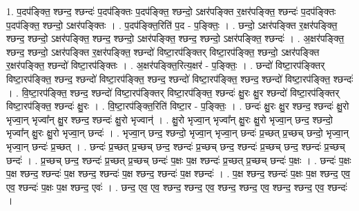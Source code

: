 \documentclass[17pt]{extarticle}
\begin{document}
1. प॒दप॑ङ्क्ति॒ श्छन्द॒ श्छन्दः॑ प॒दप॑ङ्क्तिः प॒दप॑ङ्क्ति॒ श्छन्दो॒ ऽक्षर॑पङ्क्ति र॒क्षर॑पङ्क्ति॒ श्छन्दः॑ प॒दप॑ङ्क्तिः प॒दप॑ङ्क्ति॒ श्छन्दो॒ ऽक्षर॑पङ्क्तिः । . प॒दप॑ङ्क्ति॒रिति॑ प॒द - प॒ङ्क्तिः॒ । . छन्दो॒ ऽक्षर॑पङ्क्ति र॒क्षर॑पङ्क्ति॒ श्छन्द॒ श्छन्दो॒ ऽक्षर॑पङ्क्ति॒ श्छन्द॒ श्छन्दो॒ ऽक्षर॑पङ्क्ति॒ श्छन्द॒ श्छन्दो॒ ऽक्षर॑पङ्क्ति॒ श्छन्दः॑ । . अ॒क्षर॑पङ्क्ति॒ श्छन्द॒ श्छन्दो॒ ऽक्षर॑पङ्क्ति र॒क्षर॑पङ्क्ति॒ श्छन्दो॑ विष्टा॒रप॑ङ्क्तिर् विष्टा॒रप॑ङ्क्ति॒ श्छन्दो॒ ऽक्षर॑पङ्क्ति र॒क्षर॑पङ्क्ति॒ श्छन्दो॑ विष्टा॒रप॑ङ्क्तिः । . अ॒क्षर॑पङ्क्ति॒रित्य॒क्षर॑ - प॒ङ्क्तिः॒ । . छन्दो॑ विष्टा॒रप॑ङ्क्तिर् विष्टा॒रप॑ङ्क्ति॒ श्छन्द॒ श्छन्दो॑ विष्टा॒रप॑ङ्क्ति॒ श्छन्द॒ श्छन्दो॑ विष्टा॒रप॑ङ्क्ति॒ श्छन्द॒ श्छन्दो॑ विष्टा॒रप॑ङ्क्ति॒ श्छन्दः॑ । . वि॒ष्टा॒रप॑ङ्क्ति॒ श्छन्द॒ श्छन्दो॑ विष्टा॒रप॑ङ्क्तिर् विष्टा॒रप॑ङ्क्ति॒ श्छन्दः॑ क्षु॒रः क्षु॒र श्छन्दो॑ विष्टा॒रप॑ङ्क्तिर् विष्टा॒रप॑ङ्क्ति॒ श्छन्दः॑ क्षु॒रः । . वि॒ष्टा॒रप॑ङ्क्ति॒रिति॑ विष्टा॒र - प॒ङ्क्तिः॒ । . छन्दः॑ क्षु॒रः क्षु॒र श्छन्द॒ श्छन्दः॑ क्षु॒रो भृज्वा॒न् भृज्वा᳚न् क्षु॒र श्छन्द॒ श्छन्दः॑ क्षु॒रो भृज्वान्॑ । . क्षु॒रो भृज्वा॒न् भृज्वा᳚न् क्षु॒रः क्षु॒रो भृज्वा॒न् छन्द॒ श्छन्दो॒ भृज्वा᳚न् क्षु॒रः क्षु॒रो भृज्वा॒न् छन्दः॑ । . भृज्वा॒न् छन्द॒ श्छन्दो॒ भृज्वा॒न् भृज्वा॒न् छन्दः॑ प्र॒च्छत् प्र॒च्छच् छन्दो॒ भृज्वा॒न् भृज्वा॒न् छन्दः॑ प्र॒च्छत् । . छन्दः॑ प्र॒च्छत् प्र॒च्छच् छन्द॒ श्छन्दः॑ प्र॒च्छच् छन्द॒ श्छन्दः॑ प्र॒च्छच् छन्द॒ श्छन्दः॑ प्र॒च्छच् छन्दः॑ । . प्र॒च्छच् छन्द॒ श्छन्दः॑ प्र॒च्छत् प्र॒च्छच् छन्दः॑ प॒क्षः प॒क्ष श्छन्दः॑ प्र॒च्छत् प्र॒च्छच् छन्दः॑ प॒क्षः । . छन्दः॑ प॒क्षः प॒क्ष श्छन्द॒ श्छन्दः॑ प॒क्ष श्छन्द॒ श्छन्दः॑ प॒क्ष श्छन्द॒ श्छन्दः॑ प॒क्ष श्छन्दः॑ । . प॒क्ष श्छन्द॒ श्छन्दः॑ प॒क्षः प॒क्ष श्छन्द॒ एव॒ एव॒ श्छन्दः॑ प॒क्षः प॒क्ष श्छन्द॒ एवः॑ । . छन्द॒ एव॒ एव॒ श्छन्द॒ श्छन्द॒ एव॒ श्छन्द॒ श्छन्द॒ एव॒ श्छन्द॒ श्छन्द॒ एव॒ श्छन्दः॑ । \newline
\end{document}
